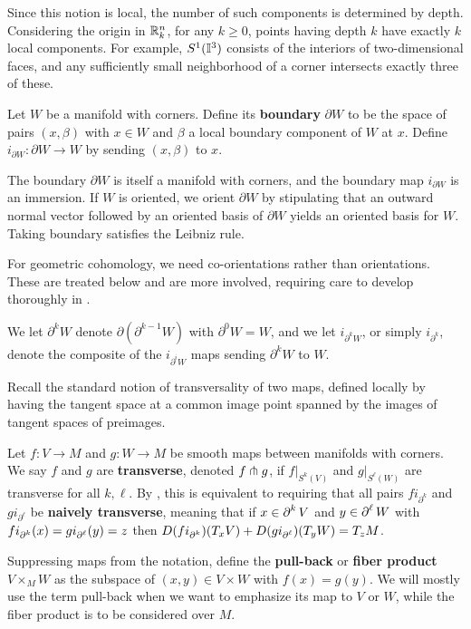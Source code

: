 Since this notion is local, the number of such components is determined by depth.
Considering the origin in $\mathbb{R}^n_k$, for any $k \geq 0$, points having depth $k$ have exactly $k$ local components.
For example, $S^1(\mathbb{I}^3)$ consists of the interiors of two-dimensional faces, and any sufficiently small neighborhood of a corner intersects exactly three of these.

\begin{definition}
	Let $W$ be a manifold with corners. Define its {\bf boundary} $\partial W$ to be the space of pairs $(x, \beta)$ with $x \in W$ and $\beta$ a local boundary component of $W$ at $x$.
	Define $i_{\partial W} \colon \partial W \to W$ by sending $(x,\beta)$ to $x$.
\end{definition}

The boundary $\partial W$ is itself a manifold with corners, and the boundary map $i_{\partial W}$ is an immersion.
If $W$ is oriented, we orient $\partial W$ by stipulating that an outward normal vector followed by an oriented basis of $\partial W$ yields an oriented basis for $W$.
Taking boundary satisfies the Leibniz rule.

For geometric cohomology, we need co-orientations rather than orientations.
These are treated below and are more involved, requiring care to develop thoroughly in \cite[Section 3]{medina2022foundations}.

We let $\partial^k W$ denote $\partial (\partial^{k-1} W)$ with $\partial^0 W = W$, and we let $i_{\partial^k W}$, or simply $i_{\partial^k}$, denote the composite of the $i_{\partial^i W}$ maps sending $\partial^k W$ to $W$.

Recall the standard notion of transversality of two maps, defined locally by having the tangent space at a common image point spanned by the images of tangent spaces of preimages.

\begin{definition}
	Let $f \colon V \to M$ and $g \colon W \to M$ be smooth maps between manifolds with corners.
	We say $f$ and $g$ are \textbf{transverse}, denoted $f \pitchfork g$, if $f|_{S^k(V)}$ and $g|_{S^\ell(W)}$ are transverse for all $k, \ell$.
	By \cite[Lemma 2.15]{medina2022foundations}, this is equivalent to requiring that all pairs $fi_{\partial^k}$ and $gi_{\partial^\ell}$ be \textbf{naively transverse}, meaning that if $x \in \operatorname{\partial}^k V$ and $y\in \operatorname{\partial}^\ell W$ with $fi_{\operatorname{\partial}^k}(x) = g i_{\operatorname{\partial}^\ell} (y) = z$ then $D(fi_{\operatorname{\partial}^k})(T_x V)+D(g i_{\operatorname{\partial}^\ell})(T_y W) = T_z M$.

	Suppressing maps from the notation, define the \textbf{pull-back} or \textbf{fiber product} $V \times_M W$ as the subspace of $(x, y) \in V \times W$ with $f(x) = g(y)$.
	We will mostly use the term pull-back when we want to emphasize its map to $V$ or $W$, while the fiber product is to be considered over $M$.
\end{definition}

